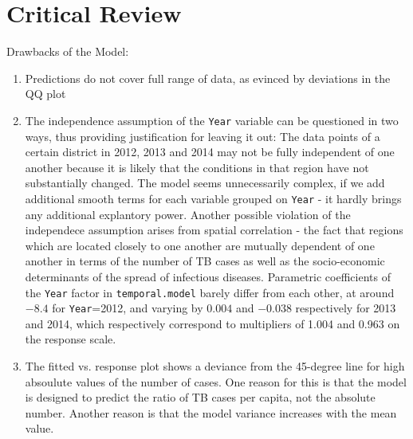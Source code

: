 \section{Critical Review}
Drawbacks of the Model:
\begin{enumerate}
\item Predictions do not cover full range of data, as evinced by deviations in the QQ plot
\item The independence assumption of the \texttt{Year} variable can be questioned in two ways, thus providing justification for leaving it out: The data points of a certain district in 2012, 2013 and 2014 may not be fully independent of one another because it is likely that the conditions in that region have not substantially changed. The model seems unnecessarily complex, if we add additional smooth terms for each variable grouped on \texttt{Year} - it hardly brings any additional explantory power. Another possible violation of the independece assumption arises from spatial correlation - the fact that regions which are located closely to one another are mutually dependent of one another in terms of the number of TB cases as well as the socio-economic determinants of the spread of infectious diseases. Parametric coefficients of the \texttt{Year} factor in \texttt{temporal.model} barely differ from each other, at around $-8.4$ for \texttt{Year}=2012, and varying by $0.004$ and $-0.038$ respectively for 2013 and 2014, which respectively correspond to multipliers of 1.004 and 0.963 on the response scale.
\item The fitted vs. response plot shows a deviance from the 45-degree line for high absoulute values of the number of cases. One reason for this is that the model is designed to predict the ratio of TB cases per capita, not the absolute number. Another reason is that the model variance increases with the mean value.
\end{enumerate}

